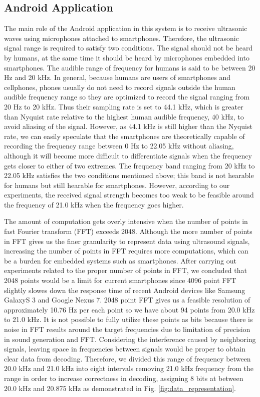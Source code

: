 \subsection{Android Application}
\label{sec:android-application}

The main role of the Android application in this system is to receive ultrasonic waves using microphones attached to smartphones. Therefore, the ultrasonic signal range is required to satisfy two conditions. The signal should not be heard by humans, at the same time it should be heard by microphones embedded into smartphones. The audible range of frequency for humans is said to be between 20 Hz and 20 kHz. In general, because humans are users of smartphones and cellphones, phones usually do not need to record signals outside the human audible frequency range so they are optimized to record the signal ranging from 20 Hz to 20 kHz. Thus their sampling rate is set to 44.1 kHz, which is greater than Nyquist rate relative to the highest human audible frequency, 40 kHz, to avoid aliasing of the signal. However, as 44.1 kHz is still higher than the Nyquist rate, we can easily speculate that the smartphones are theoretically capable of recording the frequency range between 0 Hz to 22.05 kHz without aliasing, although it will become more difficult to differentiate signals when the frequency gets closer to either of two extremes. The frequency band ranging from 20 kHz to 22.05 kHz satisfies the two conditions mentioned above; this band is not hearable for humans but still hearable for smartphones. However, according to our experiments, the received signal strength becomes too weak to be feasible around the frequency of 21.0 kHz when the frequency goes higher.

The amount of computation gets overly intensive when the number of points in fast Fourier transform (FFT) exceeds 2048. Although the more number of points in FFT gives us the finer granularity to represent data using ultrasound signals, increasing the number of points in FFT requires more computations, which can be a burden for embedded systems such as smartphones. After carrying out experiments related to the proper number of points in FFT, we concluded that 2048 points would be a limit for current smartphones since 4096 point FFT slightly slowes down the response time of recent Android devices like Samsung GalaxyS 3 and Google Nexus 7. 2048 point FFT gives us a feasible resolution of approximately 10.76 Hz per each point so we have about 94 points from 20.0 kHz to 21.0 kHz. It is not possible to fully utilize these points as bits because there is noise in FFT results around the target frequencies due to limitation of precision in sound generation and FFT. Considering the interference caused by neighboring signals, leaving space in frequencies between signals would be proper to obtain clear data from decoding. Therefore, we divided this range of frequency between 20.0 kHz and 21.0 kHz into eight intervals removing 21.0 kHz frequency from the range in order to increase correctness in decoding, assigning 8 bits at between 20.0 kHz and 20.875 kHz as demonstrated in Fig. \ref{fig:data_representation}.

